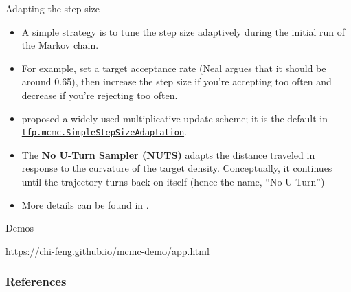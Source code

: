 \documentclass[aspectratio=169]{beamer}
\begin{document}
\begin{frame}{Adapting the step size}

\begin{itemize}
    \item A simple strategy is to tune the step size adaptively during the initial run of the Markov chain.

    \item For example, set a target acceptance rate (Neal argues that it should be around 0.65), then increase the step size if you're accepting too often and decrease if you're rejecting too often. 

    \item \citet{Andrieu2008-yc} proposed a widely-used multiplicative update scheme; it is the default in \href{https://www.tensorflow.org/probability/api_docs/python/tfp/mcmc/SimpleStepSizeAdaptation}{\texttt{tfp.mcmc.SimpleStepSizeAdaptation}}.
    
    \item The \textbf{No U-Turn Sampler (NUTS)} \citep{Hoffman2014-fl} adapts the distance traveled in response to the curvature of the target density. Conceptually, it continues until the trajectory turns back on itself (hence the name, ``No U-Turn'')
    
    \item More details can be found in \citet{Betancourt2017-ml}.
\end{itemize}

\end{frame}

\begin{frame}{Demos}
    
    \centering
    \url{https://chi-feng.github.io/mcmc-demo/app.html}
    
\end{frame}

\begin{frame}[t,allowframebreaks]
        \frametitle{References}
        
        
\end{frame}
\end{document}
